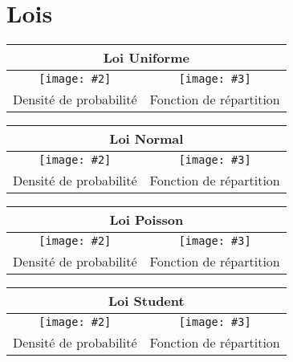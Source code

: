 \section{Lois}


\newcommand{\createTabularLoi}[3]{
\begin{tabular}{|c|c|}

    \hline
    \multicolumn{2}{|c|}{#1}\\
    \hline
    \texttt{[image: \#2]}&\texttt{[image: \#3]}\\
    Densité de probabilité & Fonction de répartition\\
    \hline

\end{tabular}}

\begin{center}
    \createTabularLoi{Loi Uniforme}{1.lois/uniform_probability_density_function.pdf}{1.lois/uniform_cumulative_distribution_function.pdf}

    \createTabularLoi{Loi Normal}{1.lois/normal_probability_density_function.pdf}{1.lois/normal_cumulative_distribution_function.pdf}
    
    \createTabularLoi{Loi Poisson}{1.lois/poisson_probability_density_function.pdf}{1.lois/poisson_cumulative_distribution_function.pdf}
    
    \createTabularLoi{Loi Student}{1.lois/student_probability_density_function.pdf}{1.lois/student_cumulative_distribution_function.pdf}
    
\end{center}


